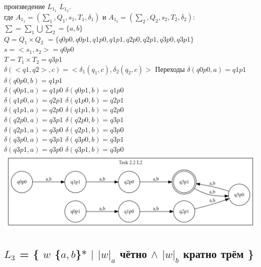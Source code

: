 \documentclass{article}
\begin{document}
\noindent{} произведение $L_1_1$ \cap $L_1_2$.
\\где  $A_1_1 = (\sum_1 , Q_1, s_1, T_1, \delta_1) $ и  $A_1_2 = (\sum_2 , Q_2, s_2, T_2, \delta_2)$:\\
$\sum = \sum_1 \bigcup \sum_2 = \{a, b\}$\\
$Q = Q_1 \times Q_2$ $= \{q0p0, q0p1, q1p0, q1p1, q2p0, q2p1, q3p0, q3p1 \}$\\
$s = <s_1, s_2> = q0p0$\\
$T = T_1 \times T_2 = q3p1$\\
$ \delta(<q1, q2>, c) = <\delta_1(q_1, c), \delta_2(q_2, c)>$
\newline Переходы
\newline 
\noindent$\delta(q0p0, a) = q1p1$ \quad  $\delta(q0p0, b) = q1p1$ \\
\noindent$\delta(q0p1, a) = q1p0$ \quad $\delta(q0p1, b) = q1p0$ \\
\noindent$\delta(q1p0, a) = q2p1$ \quad  $\delta(q1p0, b) = q2p1$ \\
\noindent$\delta(q1p1, a) = q2p0$ \quad  $\delta(q1p1, b) = q2p0$ \\
\noindent$\delta(q2p0, a) = q3p1$ \quad  $\delta(q2p0, b) = q3p1$ \\
\noindent$\delta(q2p1, a) = q3p0$ \quad  $\delta(q2p1, b) = q3p0$ \\
\noindent$\delta(q3p0, a) = q3p1$ \quad  $\delta(q3p0, b) = q3p1$ \\
\noindent$\delta(q3p1, a) = q3p0$ \quad  $\delta(q3p1, b) = q3p0$ \\
\newline\includegraphics[scale=0.4]{2_2_3.png}

\subsection{$L_3$ = \{ $w$ \in \{$a,b$\}$*$ $|$  $ {|w|_a}$ чётно  $\wedge$ ${|w|_b}$ кратно трём \} }\\
\end{document}
